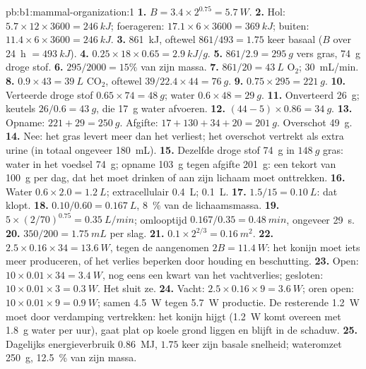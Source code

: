 \begin{solution}{pb:b1:mammal-organization:1}
\textbf{1.} $B = 3.4\times 2^{0.75} = \qty{5.7}{W}$.
\textbf{2.} Hol: $5.7\times 12\times 3600 = \qty{246}{kJ}$;
foerageren: $17.1\times 6\times 3600 = \qty{369}{kJ}$; buiten:
$11.4\times 6\times 3600 = \qty{246}{kJ}$.
\textbf{3.} \qty{861}{kJ}, oftewel $861/493 = 1.75$ keer basaal
($B$ over \qty{24}{h} $= \qty{493}{kJ}$).
\textbf{4.} $0.25\times 18\times 0.65 = \qty{2.9}{kJ/g}$.
\textbf{5.} $861/2.9 = \qty{295}{g}$ vers gras, \qty{74}{g} droge
stof.
\textbf{6.} $295/2000 = 15\%$ van zijn massa.
\textbf{7.} $861/20 = \qty{43}{L}$ $\mathrm{O_2}$; \qty{30}{mL/min}.
\textbf{8.} $0.9\times 43 = \qty{39}{L}$ $\mathrm{CO_2}$, oftewel $39/22.4\times 44 = \qty{76}{g}$.
\textbf{9.} $0.75\times 295 = \qty{221}{g}$.
\textbf{10.} Verteerde droge stof $0.65\times 74 = \qty{48}{g}$; water
$0.6\times 48 = \qty{29}{g}$.
\textbf{11.} Onverteerd \qty{26}{g}; keutels $26/0.6 = \qty{43}{g}$,
die \qty{17}{g} water afvoeren.
\textbf{12.} $(44 - 5)\times 0.86 = \qty{34}{g}$.
\textbf{13.} Opname: $221 + 29 = \qty{250}{g}$. Afgifte: $17 + 130 + 34 + 20
= \qty{201}{g}$. Overschot \qty{49}{g}.
\textbf{14.} Nee: het gras levert meer dan het verliest; het overschot
vertrekt als extra urine (in totaal ongeveer \qty{180}{mL}).
\textbf{15.} Dezelfde droge stof \qty{74}{g} in $\qty{148}{g}$ gras:
water in het voedsel \qty{74}{g}; opname \qty{103}{g} tegen afgifte
\qty{201}{g}: een tekort van \qty{100}{g} per dag, dat het moet drinken of
aan zijn lichaam moet onttrekken.
\textbf{16.} Water $0.6\times 2.0 = \qty{1.2}{L}$; extracellulair
\qty{0.4}{L};  \qty{0.1}{L}.
\textbf{17.} $1.5/15 = \qty{0.10}{L}$: dat klopt.
\textbf{18.} $0.10/0.60 = \qty{0.167}{L}$, \qty{8}{\%} van de lichaamsmassa.
\textbf{19.} $5\times(2/70)^{0.75} = \qty{0.35}{L/min}$; omlooptijd
$0.167/0.35 = \qty{0.48}{min}$, ongeveer \qty{29}{s}.
\textbf{20.} $350/200 = \qty{1.75}{mL}$ per slag.
\textbf{21.} $0.1\times 2^{2/3} = \qty{0.16}{m^2}$.
\textbf{22.} $2.5\times 0.16\times 34 = \qty{13.6}{W}$, tegen de
aangenomen $2B = \qty{11.4}{W}$: het konijn moet iets meer produceren, of het
verlies beperken door houding en beschutting.
\textbf{23.} Open: $10\times 0.01\times 34 = \qty{3.4}{W}$, nog eens een
kwart van het vachtverlies; gesloten: $10\times 0.01\times 3 =
\qty{0.3}{W}$. Het sluit ze.
\textbf{24.} Vacht: $2.5\times 0.16\times 9 = \qty{3.6}{W}$; oren open:
$10\times 0.01\times 9 = \qty{0.9}{W}$; samen \qty{4.5}{W} tegen
\qty{5.7}{W} productie. De resterende \qty{1.2}{W} moet door verdamping
vertrekken: het konijn hijgt (\qty{1.2}{W} komt overeen met \qty{1.8}{g} water
per uur), gaat plat op koele grond liggen en blijft in de schaduw.
\textbf{25.} Dagelijks energieverbruik \qty{0.86}{MJ}, $1.75$ keer zijn
basale snelheid; wateromzet \qty{250}{g}, \qty{12.5}{\%} van zijn massa.
\end{solution}
